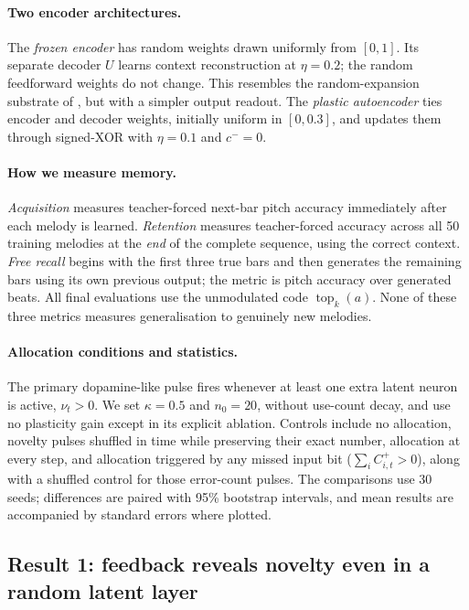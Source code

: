 \documentclass[11pt,a4paper]{article}
\newcommand{\topk}{\operatorname{top}_k}
\begin{document}
\paragraph{Two encoder architectures.}
The \emph{frozen encoder} has random weights drawn uniformly from $[0,1]$. Its separate decoder $U$ learns context reconstruction at $\eta=0.2$; the random feedforward weights do not change. This resembles the random-expansion substrate of \citet{pena2026songs}, but with a simpler output readout. The \emph{plastic autoencoder} ties encoder and decoder weights, initially uniform in $[0,0.3]$, and updates them through signed-XOR with $\eta=0.1$ and $c^-=0$.

\paragraph{How we measure memory.}
\emph{Acquisition} measures teacher-forced next-bar pitch accuracy immediately after each melody is learned. \emph{Retention} measures teacher-forced accuracy across all 50 training melodies at the \emph{end} of the complete sequence, using the correct context. \emph{Free recall} begins with the first three true bars and then generates the remaining bars using its own previous output; the metric is pitch accuracy over generated beats. All final evaluations use the unmodulated code $\topk(a)$. None of these three metrics measures generalisation to genuinely new melodies.

\paragraph{Allocation conditions and statistics.}
The primary dopamine-like pulse fires whenever at least one extra latent neuron is active, $\nu_t>0$. We set $\kappa=0.5$ and $n_0=20$, without use-count decay, and use no plasticity gain except in its explicit ablation. Controls include no allocation, novelty pulses shuffled in time while preserving their exact number, allocation at every step, and allocation triggered by any missed input bit ($\sum_i C^+_{i,t}>0$), along with a shuffled control for those error-count pulses. The comparisons use 30 seeds; differences are paired with 95\% bootstrap intervals, and mean results are accompanied by standard errors where plotted.

\subsection{Result 1: feedback reveals novelty even in a random latent layer}
\end{document}
